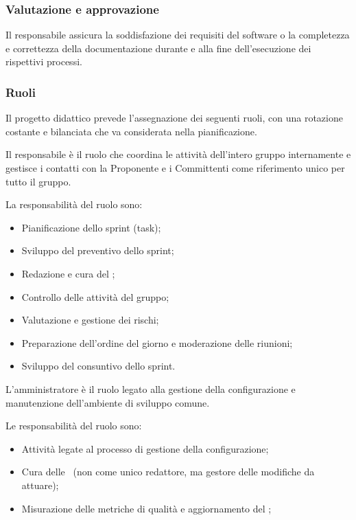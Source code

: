\subsubsection{Valutazione e approvazione}
Il responsabile assicura la soddisfazione dei requisiti del software o la completezza e correttezza della documentazione durante e alla fine dell'esecuzione dei rispettivi processi.

\subsubsection{Ruoli}
\par Il progetto didattico prevede l'assegnazione dei seguenti ruoli, con una rotazione costante e bilanciata che va considerata nella pianificazione.

\par Il responsabile è il ruolo che coordina le attività dell'intero gruppo internamente e gestisce i contatti con la Proponente e i Committenti come riferimento unico per tutto il gruppo.
\par La responsabilità del ruolo sono:
\begin{itemize}
  \item Pianificazione dello sprint (task);
  \item Sviluppo del preventivo dello sprint;
  \item Redazione e cura del \PdP;
  \item Controllo delle attività del gruppo;
  \item Valutazione e gestione dei rischi;
  \item Preparazione dell'ordine del giorno e moderazione delle riunioni;
  \item Sviluppo del consuntivo dello sprint.
\end{itemize}

\par L'amministratore è il ruolo legato alla gestione della configurazione e manutenzione dell'ambiente di sviluppo comune.
\par Le responsabilità del ruolo sono:
\begin{itemize}
  \item Attività legate al processo di gestione della configurazione;
  \item Cura delle \NdP\ (non come unico redattore, ma gestore delle modifiche da attuare);
  \item Misurazione delle metriche di qualità e aggiornamento del \PdQ;
\end{itemize}

